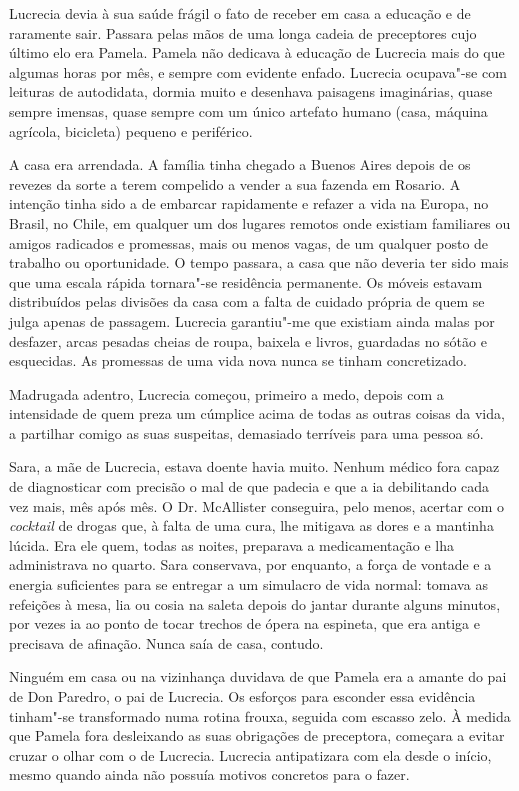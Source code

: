Lucrecia devia à sua saúde frágil o fato de receber em casa a educação
e de raramente sair. Passara pelas mãos de uma longa cadeia de
preceptores cujo último elo era Pamela. Pamela não dedicava à educação
de Lucrecia mais do que algumas horas por mês, e sempre com evidente
enfado. Lucrecia ocupava"-se com leituras de autodidata, dormia muito e
desenhava paisagens imaginárias, quase sempre imensas, quase sempre
com um único artefato humano (casa, máquina agrícola, bicicleta)
pequeno e periférico.

A casa era arrendada. A família tinha chegado a Buenos Aires depois de
os revezes da sorte a terem compelido a vender a sua fazenda em Rosario.
A intenção tinha sido a de embarcar rapidamente e refazer a vida na
Europa, no Brasil, no Chile, em qualquer um dos lugares remotos onde
existiam familiares ou amigos radicados e promessas, mais ou menos
vagas, de um qualquer posto de trabalho ou oportunidade. O tempo passara, a casa que não deveria ter sido mais que uma escala rápida
tornara"-se residência permanente. Os móveis estavam distribuídos pelas
divisões da casa com a falta de cuidado própria de quem se julga apenas
de passagem. Lucrecia garantiu"-me que existiam ainda malas por desfazer,
arcas pesadas cheias de roupa, baixela e livros, guardadas no sótão e
esquecidas. As promessas de uma vida nova nunca se tinham concretizado.

Madrugada adentro, Lucrecia começou, primeiro a medo, depois com a
intensidade de quem preza um cúmplice acima
de todas as outras coisas da vida, a partilhar comigo as suas suspeitas,
demasiado terríveis para uma pessoa só.

Sara, a mãe de Lucrecia, estava doente havia muito. Nenhum médico fora
capaz de diagnosticar com precisão o mal de que padecia e que a ia
debilitando cada vez mais, mês após mês. O Dr. McAllister conseguira,
pelo menos, acertar com o \emph{cocktail }de drogas que, à falta de uma
cura, lhe mitigava as dores e a mantinha lúcida. Era ele quem, todas as
noites, preparava a medicamentação e lha administrava no quarto. Sara
conservava, por enquanto, a força de vontade e a energia suficientes
para se entregar a um simulacro de vida normal: tomava as refeições à
mesa, lia ou cosia na saleta depois do jantar durante alguns minutos,
por vezes ia ao ponto de tocar trechos de ópera na espineta, que era
antiga e precisava de afinação. Nunca saía de casa, contudo.

Ninguém em casa ou na vizinhança duvidava de que Pamela era a amante do
pai de Don Paredro, o pai de Lucrecia. Os esforços para esconder essa
evidência tinham"-se transformado numa rotina frouxa, seguida com escasso
zelo. À medida que Pamela fora desleixando as suas obrigações de
preceptora, começara a evitar cruzar o olhar com o de Lucrecia.
Lucrecia antipatizara com ela desde o início, mesmo quando ainda não
possuía motivos concretos para o fazer.

